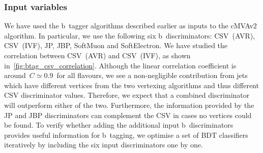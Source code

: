 \subsubsection{Input variables}
We have used the b~tagger algorithms described earlier as inputs to the cMVAv2 algorithm. In particular, we use the following six b~discriminators: CSV~(AVR), CSV~(IVF), JP, JBP, SoftMuon and SoftElectron. We have studied the correlation between CSV~(AVR) and CSV~(IVF), as shown in~\cref{fig:btag_csv_correlation}. Although the linear correlation coefficient is around~$C \simeq 0.9$~for all flavours, we see a non-negligible contribution from jets which have different vertices from the two vertexing algorithms and thus different CSV discriminator values. Therefore, we expect that a combined discriminator will outperform either of the two. Furthermore, the information provided by the JP and JBP discriminators can complement the CSV in cases no vertices could be found. To verify whether adding the additional input b~discriminators provides useful information for b~tagging, we optimise a set of BDT classifiers iteratively by including the six input discriminators one by one.

